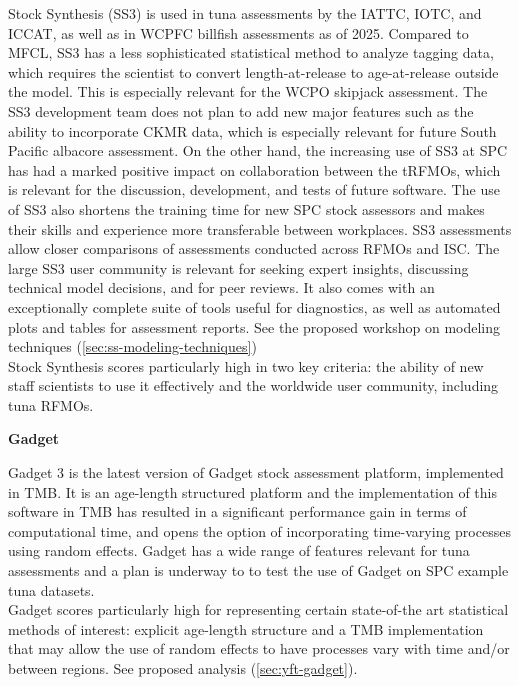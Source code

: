\documentclass{SCreport}
\begin{document}
Stock Synthesis (SS3) is used in tuna assessments by the IATTC, IOTC, and ICCAT,
as well as in WCPFC billfish assessments as of 2025. Compared to MFCL, SS3 has a
less sophisticated statistical method to analyze tagging data, which requires
the scientist to convert length-at-release to age-at-release outside the model.
This is especially relevant for the WCPO skipjack assessment. The SS3
development team does not plan to add new major features such as the ability to
incorporate CKMR data, which is especially relevant for future South Pacific
albacore assessment. On the other hand, the increasing use of SS3 at SPC has had
a marked positive impact on collaboration between the tRFMOs, which is relevant
for the discussion, development, and tests of future software. The use of SS3
also shortens the training time for new SPC stock assessors and makes their
skills and experience more transferable between workplaces. SS3 assessments
allow closer comparisons of assessments conducted across RFMOs and ISC. The
large SS3 user community is relevant for seeking expert insights, discussing
technical model decisions, and for peer reviews. It also comes with an
exceptionally complete suite of tools useful for diagnostics, as well as
automated plots and tables for assessment reports. See the proposed
workshop on modeling techniques (\autoref{sec:ss-modeling-techniques})\\[-4.5ex]

Stock Synthesis scores particularly high in two key criteria: the ability of new
staff scientists to use it effectively and the worldwide user community,
including tuna RFMOs.

\vspace{1ex}

\textbf{Gadget}
\label{sec:gadget-software-evaluation}

\vspace{-1ex}

Gadget 3 is the latest version of Gadget stock assessment platform, implemented
in TMB. It is an age-length structured platform and the implementation of this
software in TMB has resulted in a significant performance gain in terms of
computational time, and opens the option of incorporating time-varying processes
using random effects. Gadget has a wide range of features relevant for tuna
assessments and a plan is underway to to test the use of Gadget on SPC example
tuna datasets.\\[-4.5ex]

Gadget scores particularly high for representing certain state-of-the art
statistical methods of interest: explicit age-length structure and a TMB
implementation that may allow the use of random effects to have processes vary
with time and/or between regions. See proposed analysis
(\autoref{sec:yft-gadget}).
\end{document}

